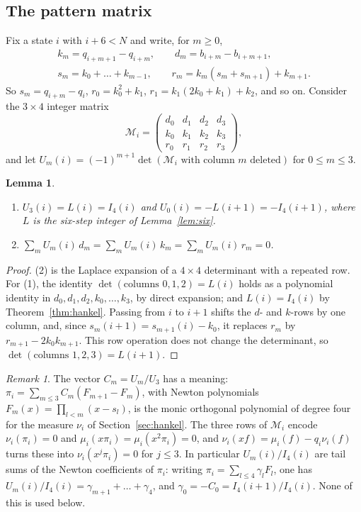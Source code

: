 \documentclass[11pt]{amsart}
\newtheorem{lemma}[theorem]{Lemma}
\theoremstyle{definition}
\theoremstyle{remark}
\newtheorem{remark}[theorem]{Remark}
\begin{document}
\subsection{The pattern matrix}
Fix a state $i$ with $i+6<N$ and write, for $m\ge0$,
\begin{gather*}
k_m=q_{i+m+1}-q_{i+m},\qquad d_m=b_{i+m}-b_{i+m+1},\\
s_m=k_0+\dots+k_{m-1},\qquad r_m=k_m(s_m+s_{m+1})+k_{m+1}.
\end{gather*}
So $s_m=q_{i+m}-q_i$, $r_0=k_0^2+k_1$, $r_1=k_1(2k_0+k_1)+k_2$, and so on. Consider the
$3\times4$ integer matrix
\[
\mathcal M_i=\begin{pmatrix} d_0&d_1&d_2&d_3\\ k_0&k_1&k_2&k_3\\ r_0&r_1&r_2&r_3\end{pmatrix},
\]
and let $U_m(i)=(-1)^{m+1}\det(\mathcal M_i\text{ with column $m$ deleted})$ for
$0\le m\le3$.

\begin{lemma}\label{lem:pattern}
\begin{enumerate}
\item $U_3(i)=L(i)=I_4(i)$ and $U_0(i)=-L(i+1)=-I_4(i+1)$, where $L$ is the six-step integer of
Lemma~\ref{lem:six}.
\item $\sum_m U_m(i)\,d_m=\sum_m U_m(i)\,k_m=\sum_m U_m(i)\,r_m=0$.
\end{enumerate}
\end{lemma}

\begin{proof}
(2) is the Laplace expansion of a $4\times4$ determinant with a repeated row. For (1), the
identity $\det(\text{columns }0,1,2)=L(i)$ holds as a polynomial identity in
$d_0,d_1,d_2,k_0,\dots,k_3$, by direct expansion; and $L(i)=I_4(i)$ by
Theorem~\ref{thm:hankel}. Passing from $i$ to $i+1$ shifts the $d$- and $k$-rows by one
column, and, since $s_m(i+1)=s_{m+1}(i)-k_0$, it replaces $r_m$ by $r_{m+1}-2k_0k_{m+1}$. This
row operation does not change the determinant, so $\det(\text{columns }1,2,3)=L(i+1)$.
\end{proof}

\begin{remark}
The vector $C_m=U_m/U_3$ has a meaning: $\pi_i=\sum_{m\le3}C_m(F_{m+1}-F_m)$, with Newton
polynomials $F_m(x)=\prod_{l<m}(x-s_l)$, is the monic orthogonal polynomial of degree four for
the measure $\nu_i$ of Section~\ref{sec:hankel}. The three rows of $\mathcal M_i$ encode
$\nu_i(\pi_i)=0$ and $\mu_i(x\pi_i)=\mu_i(x^2\pi_i)=0$, and $\nu_i(xf)=\mu_i(f)-q_i\nu_i(f)$ turns these
into $\nu_i(x^j\pi_i)=0$ for $j\le3$. In particular $U_m(i)/I_4(i)$ are tail sums of the
Newton coefficients of $\pi_i$: writing $\pi_i=\sum_{l\le4}\gamma_lF_l$, one has $U_m(i)/I_4(i)=\gamma_{m+1}+\dots+\gamma_4$,
and $\gamma_0=-C_0=I_4(i+1)/I_4(i)$. None of this is used below.
\end{remark}
\end{document}
